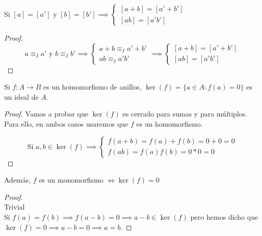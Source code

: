 Si $[a] = [a']$ y $[b] = [b'] \implies \begin{cases}
	[a+b] = [a' +b']\\
	[ab] = [a'b']
\end{cases}$

\begin{proof}
  \[
  a\equiv_I a' \text{ y } b \equiv_I b' \implies \begin{cases}
	a+b \equiv_I a'+b'\\
	ab \equiv_I a'b'
        \end{cases}\implies \begin{cases}
	[a+b] = [a'+b']\\
	[ab] = [a'b']
  \end{cases}
  \]
\end{proof}


\begin{nprop}
  Si $f:A \to B$ es un homomorfismo de anillos, $\ker(f) = \{a \in A: f(a) = 0\}$ es un ideal de $A$. \\

  \begin{proof}
   Vamos a probar que $\ker(f)$ es cerrado para sumas y para múltiplos. Para ello, en ambos casos usaremos que $f$ es un homomorfismo.

  \[
     \text{Si } a,b \in \ker(f) \implies
     \begin{cases}
       f(a+b) = f(a)+f(b) = 0 + 0 = 0 \\
       f(ab) = f(a)f(b) = 0*0 = 0
     \end{cases}
  \]
\end{proof}

Además, $f$ es un monomorfismo $\iff \ker(f) = 0$
\begin{proof}\hfill\\
	\boxed{\Rightarrow} Trivial\\
	\boxed{\Leftarrow} Si $f(a) = f(b) \implies f(a-b) = 0 \implies a-b \in \ker(f)$ pero hemos dicho que $\ker(f) = 0 \implies a-b = 0 \implies a = b$.
\end{proof}
\end{nprop}

